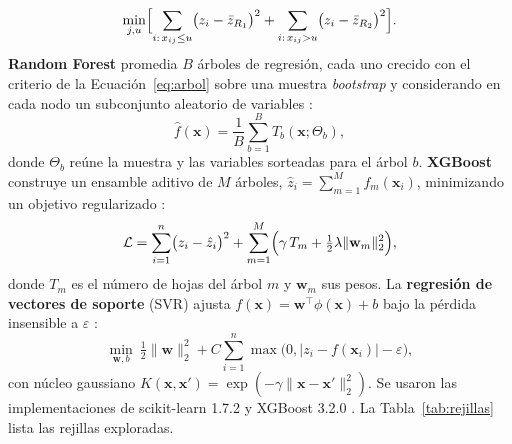 \documentclass[pdflatex,sn-mathphys-num]{sn-jnl}
\begin{document}
\begin{equation}
\min_{j,u}\Bigl[\sum_{i:\,x_{ij}\le u}\bigl(z_i-\bar{z}_{R_1}\bigr)^2+\sum_{i:\,x_{ij}>u}\bigl(z_i-\bar{z}_{R_2}\bigr)^2\Bigr].
\label{eq:arbol}
\end{equation}
\textbf{Random Forest} promedia $B$ árboles de regresión, cada uno crecido con el criterio de la Ecuación~\eqref{eq:arbol} sobre una muestra \emph{bootstrap} y considerando en cada nodo un subconjunto aleatorio de variables \cite{breiman2001}:
\begin{equation}
\hat{f}(\mathbf{x})=\frac{1}{B}\sum_{b=1}^{B}T_b(\mathbf{x};\Theta_b),
\label{eq:rf}
\end{equation}
donde $\Theta_b$ reúne la muestra y las variables sorteadas para el árbol $b$. \textbf{XGBoost} construye un ensamble aditivo de $M$ árboles, $\hat{z}_i=\sum_{m=1}^{M}f_m(\mathbf{x}_i)$, minimizando un objetivo regularizado \cite{chen2016}:
\begin{equation}
\mathcal{L}=\sum_{i=1}^{n}\bigl(z_i-\hat{z}_i\bigr)^2+\sum_{m=1}^{M}\Bigl(\gamma\,T_m+\tfrac{1}{2}\lambda\lVert\mathbf{w}_m\rVert_2^2\Bigr),
\label{eq:xgb}
\end{equation}
donde $T_m$ es el número de hojas del árbol $m$ y $\mathbf{w}_m$ sus pesos. La \textbf{regresión de vectores de soporte} (SVR) ajusta $f(\mathbf{x})=\mathbf{w}^{\top}\phi(\mathbf{x})+b$ bajo la pérdida insensible a $\varepsilon$ \cite{drucker1997}:
\begin{equation}
\min_{\mathbf{w},b}\ \tfrac{1}{2}\lVert\mathbf{w}\rVert_2^2+C\sum_{i=1}^{n}\max\bigl(0,\lvert z_i-f(\mathbf{x}_i)\rvert-\varepsilon\bigr),
\label{eq:svr}
\end{equation}
con núcleo gaussiano $K(\mathbf{x},\mathbf{x}')=\exp(-\gamma\lVert\mathbf{x}-\mathbf{x}'\rVert_2^2)$. Se usaron las implementaciones de scikit-learn 1.7.2 \cite{pedregosa2011} y XGBoost 3.2.0 \cite{chen2016}. La Tabla~\ref{tab:rejillas} lista las rejillas exploradas.
\end{document}
